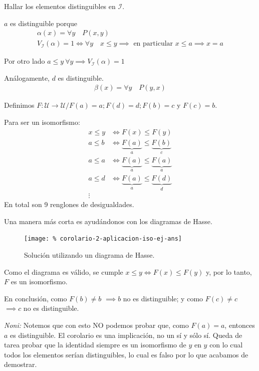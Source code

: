 Hallar los elementos distinguibles en $\mathcal{I}$.

\medskip

$a$ es distinguible porque
\begin{gather*}
    \alpha(x) = \forall y \quad P(x,y)\\
    V_{\mathcal{I}}(\alpha) = 1 \iff
    \forall y \quad x \leq y \implies \text{ en particular } x \leq a
    \implies x = a
\end{gather*}

Por otro lado $a \leq y ~ \forall y \implies V_{\mathcal{I}}(\alpha)=1$

Análogamente, $d$ es distinguible.
\begin{gather*}
    \beta(x) = \forall y \quad P(y,x)
\end{gather*}

%
Definimos $F: \mathcal{U} \to \mathcal{U} / F(a) = a; F(d) = d; F(b) = c
\text{ y }F(c) = b$.

Para ser un isomorfismo:
\begin{align*}
    x \leq y &\iff F(x) \leq F(y)\\
    a \leq b &\iff \underbrace{F(a)}_{a} \leq \underbrace{F(b)}_{c}\\
    a \leq a &\iff \underbrace{F(a)}_{a} \leq \underbrace{F(a)}_{a}\\
    a \leq d &\iff \underbrace{F(a)}_{a} \leq \underbrace{F(d)}_{d}\\
    \vdots
\end{align*}
En total son 9 renglones de desigualdades.

Una manera más corta es ayudándonos con los diagramas de Hasse.
\begin{figure}[H]
    \centering
    \texttt{[image: \%
    corolario-2-aplicacion-iso-ej-ans]}
    \caption{Solución utilizando un diagrama de Hasse.}
\end{figure}

Como el diagrama es válido, se cumple $x \leq y \iff F(x) \leq F(y)$ y,
por lo tanto, $F$ es un isomorfismo.

En conclusión, como $F(b) \neq b$ $\implies b$ no es distinguible; y como
$F(c) \neq c$ $\implies c$ no es distinguible.


\bigskip
\textit{Noni:}
Notemos que con esto NO podemos probar que, como $F(a) = a$, entonces $a$ es
distinguible. El corolario es una implicación, no un sí y sólo sí.
Queda de tarea probar que la identidad siempre es un isomorfismo de $y$ en
$y$ con lo cual todos los elementos serían distinguibles, lo cual es falso
por lo que acabamos de demostrar.

